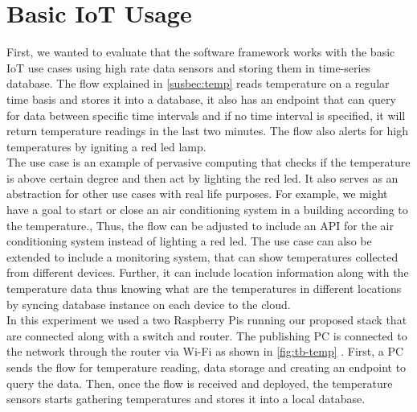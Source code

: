 \section{Basic IoT Usage}

First, we wanted to evaluate that the software framework works with the basic IoT use cases using high rate data sensors and storing them in time-series database. The flow explained in \ref{susbec:temp}  reads temperature on a regular time basis and stores it into a database, it also has an endpoint that can query for data between specific time intervals and if no time interval is specified, it will return temperature readings in the last two minutes. The flow also alerts for high temperatures by igniting a red led lamp. \\

\noindent The use case is an example of pervasive computing that checks if the temperature is above certain degree and then act by lighting the red led. It also serves as an abstraction for other use cases with real life purposes. For example, we might have a goal to start or close an air conditioning system in a building according to the temperature., Thus, the flow can be adjusted to include an API for the air conditioning system instead of lighting a red led. The use case can also be extended to include a monitoring system, that can show temperatures collected from different devices. Further, it can include location information along with the temperature data thus knowing what are the temperatures in different locations by syncing database instance on each device to the cloud.\\

\noindent In this experiment we used a two Raspberry Pis running our proposed stack that are connected along with a switch and router. The publishing PC is connected to the network through the router via Wi-Fi as shown in \ref{fig:tb-temp} . First, a PC sends the flow for temperature reading, data storage and creating an endpoint to query the data. Then, once the flow is received and deployed, the temperature sensors starts gathering temperatures and stores it into a local database. 

